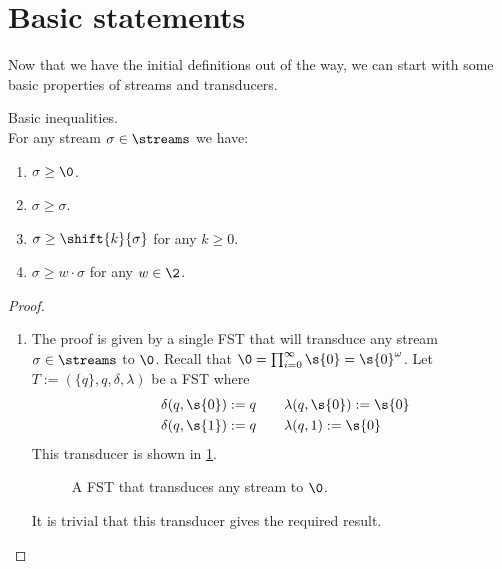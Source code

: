 
% 
	
\section{Basic statements}
Now that we have the initial definitions out of the way, we can start with some basic properties of streams and transducers.

\begin{proposition}{Basic inequalities.}\label{basic_ineq}\\
	For any stream $\sigma\in\streams$ we have:
	\begin{enumerate}
		\item $\sigma \geq \0$. \label{basic_ineq.all_zero}
		\item $\sigma \geq \sigma$. \label{basic_ineq.reflexivity}
		\item $\sigma \geq \shift{k}{\sigma}$ for any $k\geq 0$. \label{basic_ineq.shift}
		\item $\sigma \geq w\cdot\sigma$ for any $w\in\2$. \label{basic_ineq.prepend}
	\end{enumerate}
	\begin{proof}\hfill
		\begin{enumerate}
			\item The proof is given by a single FST that will transduce any stream $\sigma \in \streams$ to $\0$. Recall that $\0 = \prod_{i=0}^{\infty}\s{0}= \s{0}^{\omega}$. 
			Let $T := (\{q\}, q, \delta, \lambda)$ be a FST where 
			\begin{align*}
				\delta(q,\s{0}):=q & \qquad\lambda(q,\s{0}) := \s{0} \\
				\qquad\delta(q,\s{1}):=q & \qquad\lambda(q,1):= \s{0}
			\end{align*}
			This transducer is shown in \cref{fig:basic_ineq.all_zero.trans}.
			\begin{figure}[H]
				\centering
				\caption{A FST that transduces any stream to $\0$.}
				\label{fig:basic_ineq.all_zero.trans}
			\end{figure}
			It is trivial that this transducer gives the required result.


\end{enumerate}
\end{proof}
\end{proposition}
